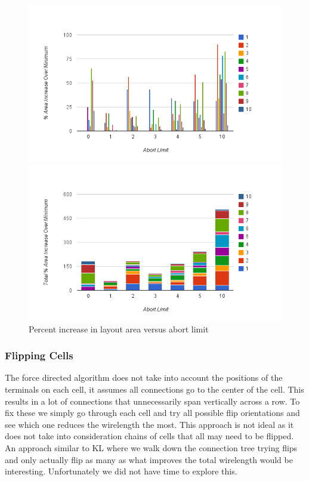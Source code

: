 \documentclass[10pt]{article}
\begin{document}
        \begin{figure}[H]
            \centering
            \begin{minipage}{.5\textwidth}
                \centering
                \includegraphics[width=0.98\linewidth]{./abort_limit.png}
            \end{minipage}%
            \begin{minipage}{.5\textwidth}
                \centering
                \includegraphics[width=0.98\linewidth]{./abort_limit_stacked.png}
            \end{minipage}
            \caption{Percent increase in layout area versus abort limit}
        \end{figure}

        \subsubsection{Flipping Cells}

        The force directed algorithm does not take into account the positions
        of the terminals on each cell, it assumes all connections go to the
        center of the cell. This results in a lot of connections that
        unnecessarily span vertically across a row. To fix these we simply go
        through each cell and try all possible flip orientations and see which
        one reduces the wirelength the most. This approach is not ideal as it
        does not take into consideration chains of cells that all may need to
        be flipped. An approach similar to KL where we walk down the connection
        tree trying flips and only actually flip as many as what improves
        the total wirelength would be interesting. Unfortunately we did not
        have time to explore this.
\end{document}

